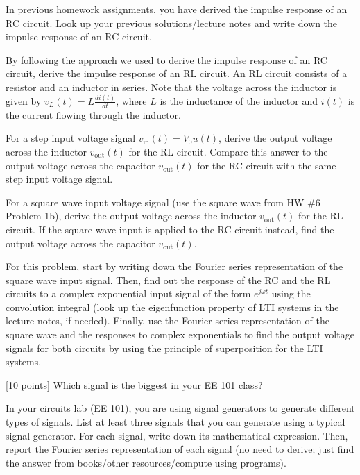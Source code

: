 \documentclass{ee102_pset}
\author{\rule{3cm}{0.4pt}} %
\begin{document}

\problempart [5 points] In previous homework assignments, you have derived the impulse response of an RC circuit. Look up your previous solutions/lecture notes and write down the impulse response of an RC circuit.

\problempart [20 points] By following the approach we used to derive the impulse response of an RC circuit, derive the impulse response of an RL circuit. An RL circuit consists of a resistor and an inductor in series. Note that the voltage across the inductor is given by $v_L(t) = L \frac{di(t)}{dt}$, where $L$ is the inductance of the inductor and $i(t)$ is the current flowing through the inductor.

\problempart [20 points] For a step input voltage signal $v_{\text{in}}(t) = V_0 u(t)$, derive the output voltage across the inductor $v_{\text{out}}(t)$ for the RL circuit. Compare this answer to the output voltage across the capacitor $v_{\text{out}}(t)$ for the RC circuit with the same step input voltage signal.

\problempart [25 points] For a square wave input voltage signal (use the square wave from HW \#6 Problem 1b), derive the output voltage across the inductor $v_{\text{out}}(t)$ for the RL circuit. If the square wave input is applied to the RC circuit instead, find the output voltage across the capacitor $v_{\text{out}}(t)$.

For this problem, start by writing down the Fourier series representation of the square wave input signal. Then, find out the response of the RC and the RL circuits to a complex exponential input signal of the form $e^{j \omega t}$ using the convolution integral (look up the eigenfunction property of LTI systems in the lecture notes, if needed). Finally, use the Fourier series representation of the square wave and the responses to complex exponentials to find the output voltage signals for both circuits by using the principle of superposition for the LTI systems.

[10 points] Which signal is the biggest in your EE 101 class? 

In your circuits lab (EE 101), you are using signal generators to generate different types of signals. List at least three signals that you can generate using a typical signal generator. For each signal, write down its mathematical expression. Then, report the Fourier series representation of each signal (no need to derive; just find the answer from books/other resources/compute using programs).
\end{document}
